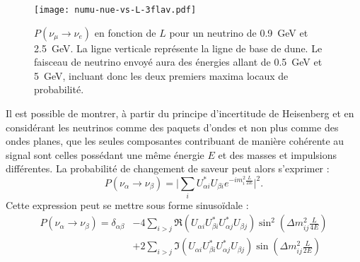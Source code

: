         \begin{figure}[!htb]
          \centering
          \texttt{[image: numu-nue-vs-L-3flav.pdf]}
          \caption[$P(\nu_{\mu}\to\nu_e)$ en fonction de $L$]{\label{fig::3flavors_oscillations}$P(\nu_{\mu}\to\nu_e)$ en fonction de $L$ pour un neutrino de \SI{0.9}{\giga\electronvolt} et \SI{2.5}{\giga\electronvolt}. La ligne verticale représente la ligne de base de \gls{dune}. Le faisceau de neutrino envoyé aura des énergies allant de \SI{0.5}{\giga\electronvolt} et \SI{5}{\giga\electronvolt}, incluant donc les deux premiers maxima locaux de probabilité.}
        \end{figure}
        Il est possible de montrer, à partir du principe d'incertitude de Heisenberg et en considérant les neutrinos comme des paquets d'ondes et non plus comme des ondes planes,  que les seules composantes contribuant de manière cohérente au signal sont celles possédant une même énergie $E$ et des masses et impulsions différentes\cite{Lipkin2004}. La probabilité de changement de saveur peut alors s'exprimer :
        \begin{equation*}
          P(\nu_{\alpha}\to\nu_{\beta}) = \bigg|\sum_i U_{\alpha i}^*U_{\beta i} e^{-im_i^2\frac{L}{2E}}\bigg|^2.
        \end{equation*}
        Cette expression peut se mettre sous forme sinusoïdale\cite{Mondal2015} :
        \begin{equation}\label{eq::proba_oscillation}
          \begin{split}
            P(\nu_{\alpha}\to\nu_{\beta}) = \delta_{\alpha\beta} & - 4\sum_{i>j}\Re(U_{\alpha i}U_{\beta i}^*U_{\alpha j}^*U_{\beta j})\sin^2\left(\Delta m_{ij}^2\frac{L}{4E}\right) \\
            & +2\sum_{i>j}\Im(U_{\alpha i}U_{\beta i}^*U_{\alpha j}^*U_{\beta j})\sin\left(\Delta m_{ij}^2\frac{L}{2E}\right)
          \end{split}
        \end{equation}
